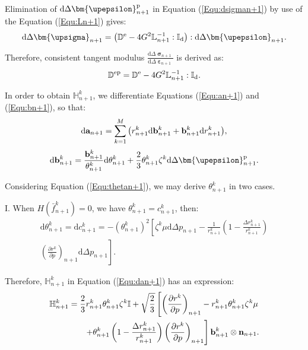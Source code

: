 Elimination of ${\text{d}}\Delta {\bm{\upepsilon }}_{n + 1}^{\rm{p}}$ in Equation (\ref{Equ:dsigman+1}) by use of the Equation (\ref{Equ:Ln+1}) gives:
\begin{equation}
{\text{d}}\Delta {{\bm{\upsigma }}_{n + 1}} = \left( {{\mathbb{D}^{\rm{e}}} - 4{G^2}\mathbb{L}_{n + 1}^{ - 1}:{\mathbb{I}_{\rm{d}}}} \right):{\text{d}}\Delta {{\bm{\upepsilon }}_{n + 1}}.
\end{equation}

Therefore, consistent tangent modulus $\frac{{{\text{d}}\Delta {{\bm{\upsigma }}_{n + 1}}}}{{{\text{d}}\Delta {{\bm{\upepsilon }}_{n + 1}}}}$ is derived as:
\begin{equation}
{\mathbb{D}^{\rm{ep}}} = {\mathbb{D}^{\rm{e}}} - 4{G^2}\mathbb{L}_{n + 1}^{ - 1}:{\mathbb{I}_{\rm{d}}}.
\end{equation}

In order to obtain $\mathbb{H}_{n + 1}^k$, we differentiate Equations (\ref{Equ:an+1}) and (\ref{Equ:bn+1}), so that:
\begin{equation}
{\text{d}}{{\bf{a}}_{n + 1}} = \sum\limits_{k = 1}^M {\left( {r_{n + 1}^k{\text{d}}{\bf{b}}_{n + 1}^k + {\bf{b}}_{n + 1}^k{\text{d}}r_{n + 1}^k} \right)},
\end{equation}
\begin{equation}
\label{Equ:dbn+1}
{\text{d}}{\bf{b}}_{n + 1}^k = \frac{{{\bf{b}}_{n + 1}^k}}{{\theta _{n + 1}^k}}{\text{d}}\theta _{n + 1}^k + \frac{2}{3}\theta _{n + 1}^k{\zeta ^k}{\text{d}}\Delta {\bm{\upepsilon }}_{n + 1}^{\rm{p}}.
\end{equation}

Considering Equation (\ref{Equ:thetan+1}), we may derive $\theta _{n + 1}^k$ in two cases.

I. When $H\left( {\bar f_{n + 1}^k} \right) = 0$, we have $\theta _{n + 1}^k = c_{n + 1}^k$, then:
\begin{equation}
\begin{aligned}
{\text{d}}\theta _{n + 1}^k = {\text{d}}c_{n + 1}^k =  - {\left( {\theta _{n + 1}^k} \right)^2} \left[ {\zeta ^k}\mu {\text{d}}\Delta {p_{n + 1}} - \frac{1}{{r_{n + 1}^k}}\left( {1 - \frac{{\Delta r_{n + 1}^k}}{{r_{n + 1}^k}}} \right)\right.\\
\left.{{\left( {\frac{{\partial {r^k}}}{{\partial p}}} \right)}_{n + 1}}{\text{d}}\Delta {p_{n + 1}} \right].
\end{aligned}
\end{equation}

Therefore, $\mathbb{H}_{n + 1}^k$ in Equation (\ref{Equ:dan+1}) has an expression:
\begin{equation}
\begin{aligned}
\mathbb{H}_{n + 1}^k = \frac{2}{3}r_{n + 1}^k\theta _{n + 1}^k{\zeta ^k}\mathbb{I} + \sqrt {\frac{2}{3}} \left[ {{\left( {\frac{{\partial {r^k}}}{{\partial p}}} \right)}_{n + 1}} - r_{n + 1}^k\theta _{n + 1}^k{\zeta ^k}\mu \right.\\
\left. + \theta _{n + 1}^k\left( {1 - \frac{{\Delta r_{n + 1}^k}}{{r_{n + 1}^k}}} \right){{\left( {\frac{{\partial {r^k}}}{{\partial p}}} \right)}_{n + 1}} \right]{\bf{b}}_{n + 1}^k \otimes {{\bf{n}}_{n + 1}}.
\end{aligned}
\end{equation}

